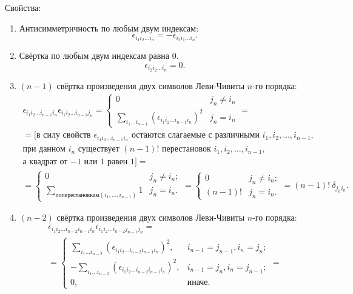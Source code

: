 \documentclass[a4paper,14pt]{extreport} %
\begin{document}
	Свойства:
	\begin{enumerate}
		\item Антисимметричность по любым двум индексам:
		\[
		\epsilon_{i_1i_2\ldots i_n} = - \epsilon_{i_2i_1\ldots i_n}.
		\]
		\item Свёртка по любым двум индексам равна 0.
		\[
		\epsilon_{i_2i_2\ldots i_n} = 0.
		\]
		\item $(n-1)$ свёртка произведения двух символов Леви-Чивиты $n$-го порядка:
		\begin{gather*}
		\epsilon_{i_1 i_2 \ldots i_{n-1} i_n} \epsilon_{i_1 i_2 \ldots i_{n-1} j_n} =
		\begin{cases}
		0 & j_n \ne i_n \\
		\sum\limits_{i_1 \ldots i_{n-1}} \left(\epsilon_{i_1 i_2 \ldots i_{n-1} i_n}\right)^2 & j_n = i_n
		\end{cases}
		= \\
		= [\text{в силу свойств $\epsilon_{i_1 i_2 \ldots i_{n-1} i_n}$ остаются слагаемые с различными $i_1, i_2, \ldots, i_{n-1}$,} \\
		\text{при данном $i_n$ существует $(n-1)!$ перестановок $i_1, i_2, \ldots, i_{n-1}$,} \\ \text{а квадрат от $-1$ или $1$ равен 1}] = \\
		=
		\begin{cases}
		0 & j_n \ne i_n; \\
		\sum\limits_{по перестановкам (i_1, \ldots, i_{n-1})} 1 & j_n = i_n.
		\end{cases} = 
		\begin{cases}
		0 & j_n \ne i_n; \\
		(n-1)! & j_n = i_n.
		\end{cases} =
		(n-1)!~\delta_{j_n i_n}.
		\end{gather*}
		\item $(n-2)$ свёртка произведения двух символов Леви-Чивиты $n$-го порядка:
		\begin{gather*}
		\epsilon_{i_1 i_2 \ldots i_{n-2} i_{n-1} i_n} \epsilon_{i_1 i_2 \ldots i_{n-2} j_{n-1} j_n} = \\ =
		\begin{cases}
		\sum\limits_{i_1 \ldots i_{n-2}} 
		(\epsilon_{i_1 i_2 \ldots i_{n-2} i_{n-1} i_n})^2, & i_{n-1} = j_{n-1}, i_n = j_n; \\
		-\sum\limits_{i_1 \ldots i_{n-2}}
		(\epsilon_{i_1 i_2 \ldots i_{n-2} i_{n-1} i_n})^2, & i_{n-1} = j_n, i_n = j_{n-1}; \\
		0, & \text{иначе.}
		\end{cases} = \\ 

\end{gather*}
\end{enumerate}
\end{document}
